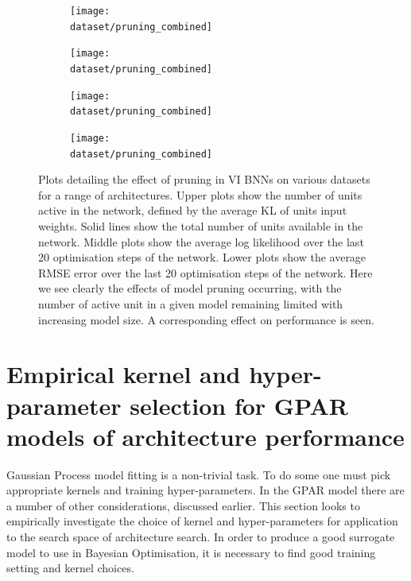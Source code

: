 \begin{figure}[ph]
	\def\dataset{\powervar}
	\def\dataname{\powername}
	\begin{subfigure}{0.48\textwidth}
		\texttt{[image: \\dataset/pruning\_combined]}
		\caption{\dataname}
		\label{fig:pruning_\dataset}
	\end{subfigure}
	\def\dataset{\proteinvar}
	\def\dataname{\proteinname}
	\begin{subfigure}{0.48\textwidth}
		\texttt{[image: \\dataset/pruning\_combined]}
		\caption{\dataname}
		\label{fig:pruning_\dataset}
	\end{subfigure}
	
	\def\dataset{\winevar}
	\def\dataname{\winename}
	\begin{subfigure}{0.48\textwidth}
		\texttt{[image: \\dataset/pruning\_combined]}
		\caption{\dataname}
		\label{fig:pruning_\dataset}
	\end{subfigure}
	\def\dataset{\yachtnvar}
	\def\dataname{\yachtname}
	\begin{subfigure}{0.48\textwidth}
		\texttt{[image: \\dataset/pruning\_combined]}
		\caption{\dataname}
		\label{fig:pruning_\dataset}
	\end{subfigure}
	\caption{Plots detailing the effect of pruning in VI BNNs on various datasets for a range of architectures. Upper plots show the number of units active in the network, defined by the average KL of units input weights. Solid lines show the total number of units available in the network. Middle plots show the average log likelihood over the last 20 optimisation steps of the network. Lower plots show the average RMSE error over the last 20 optimisation steps of the network. Here we see clearly the effects of model pruning occurring, with the number of active unit in a given model remaining limited with increasing model size. A corresponding effect on performance is seen.}
	\label{fig:pruning_2}
\end{figure}

\section{Empirical kernel and hyper-parameter selection for GPAR models of architecture performance}
\label{sec:model}

Gaussian Process model fitting is a non-trivial task. To do some one must pick appropriate kernels and training hyper-parameters. In the GPAR model there are a number of other considerations, discussed earlier. This section looks to empirically investigate the choice of kernel and hyper-parameters for application to the search space of architecture search. In order to produce a good surrogate model to use in Bayesian Optimisation, it is necessary to find good training setting and kernel choices.

